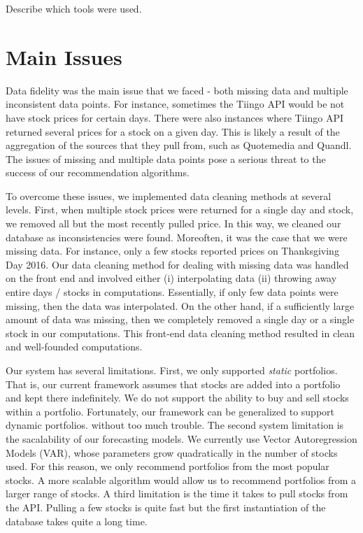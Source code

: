 \documentclass{article}
\begin{document}
Describe which tools were used.

\section{Main Issues} \label{sec:main_issues}
Data fidelity was the main issue that we faced - both missing data and multiple inconsistent data points. For instance, sometimes the Tiingo API would be not have stock prices for certain days. There were also instances where Tiingo API returned several prices for a stock on a given day. This is likely a result of the aggregation of the sources that they pull from, such as Quotemedia and Quandl. The issues of missing and multiple data points pose a serious threat to the success of our recommendation algorithms.

To overcome these issues, we implemented data cleaning methods at several levels. First, when multiple stock prices were returned for a single day and stock, we removed all but the most recently pulled price. In this way, we cleaned our database as inconsistencies were found. Moreoften, it was the case that we were missing data. For instance, only a few stocks reported prices on Thanksgiving Day 2016. Our data cleaning method for dealing with missing data was handled on the front end and involved either (i) interpolating data (ii) throwing away entire days / stocks in computations. Essentially, if only few data points were missing, then the data was interpolated. On the other hand, if a sufficiently large amount of data was missing, then we completely removed a single day or a single stock in our computations. This front-end data cleaning method resulted in clean and well-founded computations.

Our system has several limitations. First, we only supported \emph{static} portfolios. That is, our current framework assumes that stocks are added into a portfolio and kept there indefinitely. We do not support the ability to buy and sell stocks within a portfolio. Fortunately, our framework can be generalized to support dynamic portfolios. without too much trouble. The second system limitation is the sacalability of our forecasting models. We currently use Vector Autoregression Models (VAR), whose parameters grow quadratically in the number of stocks used. For this reason, we only recommend portfolios from the most popular stocks. A more scalable algorithm would allow us to recommend portfolios from a larger range of stocks. A third limitation is the time it takes to pull stocks from the API. Pulling a few stocks is quite fast but the first instantiation of the database takes quite a long time.
\end{document}
